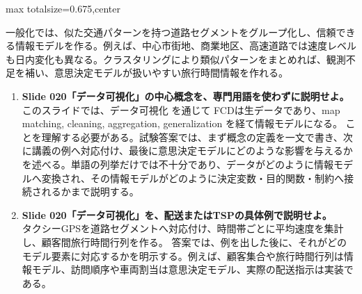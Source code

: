 \begin{adjustbox}{max totalsize={\textwidth}{0.675\textheight},center}
\begin{minipage}{\textwidth}
\begin{minipage}[t]{0.485\textwidth}
一般化では、似た交通パターンを持つ道路セグメントをグループ化し、信頼できる情報モデルを作る。例えば、中心市街地、商業地区、高速道路では速度レベルも日内変化も異なる。クラスタリングにより類似パターンをまとめれば、観測不足を補い、意思決定モデルが扱いやすい旅行時間情報を作れる。\par
{}
\begin{enumerate}
\item \textbf{Slide 020「データ可視化」の中心概念を、専門用語を使わずに説明せよ。}\\このスライドでは、データ可視化 を通じて FCDは生データであり、map matching, cleaning, aggregation, generalization を経て情報モデルになる。 ことを理解する必要がある。試験答案では、まず概念の定義を一文で書き、次に講義の例へ対応付け、最後に意思決定モデルにどのような影響を与えるかを述べる。単語の列挙だけでは不十分であり、データがどのように情報モデルへ変換され、その情報モデルがどのように決定変数・目的関数・制約へ接続されるかまで説明する。
\item \textbf{Slide 020「データ可視化」を、配送またはTSPの具体例で説明せよ。}\\タクシーGPSを道路セグメントへ対応付け、時間帯ごとに平均速度を集計し、顧客間旅行時間行列を作る。 答案では、例を出した後に、それがどのモデル要素に対応するかを明示する。例えば、顧客集合や旅行時間行列は情報モデル、訪問順序や車両割当は意思決定モデル、実際の配送指示は実装である。
\end{enumerate}
\end{minipage}
\end{minipage}
\end{adjustbox}

